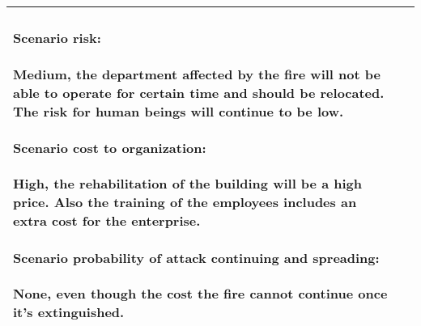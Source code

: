 \begin{longtable}{| p{4cm} | p{8cm} |}
{		\paragraph{Scenario risk:} Medium, the department affected by the fire will not be able to operate for certain time and should be relocated. The risk for human beings will continue to be low.
		\paragraph{Scenario cost to organization:}High, the rehabilitation of the building will be a high price. Also the training of the  employees includes an extra cost for the enterprise.
		\paragraph{Scenario probability of attack continuing and spreading:}None, even though the cost the fire cannot continue once it's extinguished.
	}\\\hline
	
\end{longtable}


